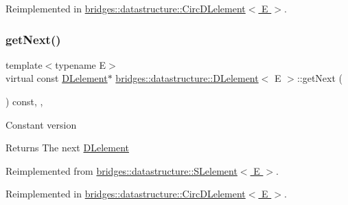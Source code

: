 Reimplemented in \hyperlink{classbridges_1_1datastructure_1_1_circ_d_lelement_a80681d0382643a6df21da1bec4067004}{bridges\+::datastructure\+::\+Circ\+D\+Lelement$<$ E $>$}.

\mbox{\label{classbridges_1_1datastructure_1_1_d_lelement_a8599e5be5fc1771d4e8a40f6de67b4a7}} 
\subsubsection{\texorpdfstring{get\+Next()}{getNext()}\hspace{0.1cm}{\footnotesize\ttfamily [2/2]}}
{\footnotesize\ttfamily template$<$typename E$>$ \\
virtual const \hyperlink{classbridges_1_1datastructure_1_1_d_lelement}{D\+Lelement}$\ast$ \hyperlink{classbridges_1_1datastructure_1_1_d_lelement}{bridges\+::datastructure\+::\+D\+Lelement}$<$ E $>$\+::get\+Next (\begin{DoxyParamCaption}{ }\end{DoxyParamCaption}) const\hspace{0.3cm}{\ttfamily [inline]}, {\ttfamily [override]}, {\ttfamily [virtual]}}

Constant version

\begin{DoxyReturn}{Returns}
The next \hyperlink{classbridges_1_1datastructure_1_1_d_lelement}{D\+Lelement} 
\end{DoxyReturn}


Reimplemented from \hyperlink{classbridges_1_1datastructure_1_1_s_lelement_a8c62cb82fa64bbfe9ebb7334a5fea417}{bridges\+::datastructure\+::\+S\+Lelement$<$ E $>$}.



Reimplemented in \hyperlink{classbridges_1_1datastructure_1_1_circ_d_lelement_a3b54f07ffa49151ed13d8b8df964a4ee}{bridges\+::datastructure\+::\+Circ\+D\+Lelement$<$ E $>$}.

\mbox{\label{classbridges_1_1datastructure_1_1_d_lelement_a0edfa823d0fc6f3dba58f85dbf5a11ff}} 
